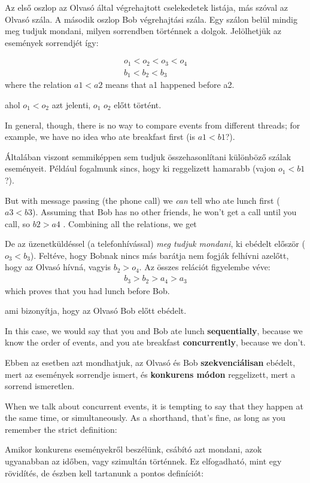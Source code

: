 \documentclass{book}
\begin{document}
Az első oszlop az Olvasó által végrehajtott cselekedetek listája,
más szóval az Olvasó szála. A második oszlop Bob végrehajtási szála.
Egy szálon belül mindig meg tudjuk mondani, milyen sorrendben történnek
a dolgok. Jelölhetjük az események sorrendjét így:

%
\begin{eqnarray*}
o_1 < o_2 < o_3 < o_4  \\
b_1 < b_2 < b_3
\end{eqnarray*}
%
where the relation $a1 < a2$ means that a1 happened before a2.

ahol $o_1 < o_2$ azt jelenti, $o_1$ $o_2$ előtt történt.

In general, though, there is no way to compare events from different
threads; for example, we have no idea who ate breakfast first (is $a1
< b1$?).

Általában viszont semmiképpen sem tudjuk összehasonlítani különböző
szálak eseményeit. Például fogalmunk sincs, hogy ki reggelizett
hamarabb (vajon $o_1<b1$?).

But with message passing (the phone call) we {\em can} tell who ate
lunch first ($a3 < b3$).  Assuming that Bob has no other friends, he
won't get a call until you call, so $b2 > a4$ .  Combining all the
relations, we get

De az üzenetküldéssel (a telefonhívással) {\em meg tudjuk mondani},
ki ebédelt először ($o_3 < b_3$). Feltéve, hogy Bobnak nincs más
barátja nem fogják felhívni azelőtt, hogy az Olvasó hívná, vagyis
$b_2 > o_4$. Az összes relációt figyelembe véve:
%
\begin{eqnarray*}
b_3 > b_2 > a_4 > a_3
\end{eqnarray*}
%
which proves that you had lunch before Bob.

ami bizonyítja, hogy az Olvasó Bob előtt ebédelt.

In this case, we would say that you and Bob ate lunch
{\bf sequentially}, because we know the order of events, and you
ate breakfast {\bf concurrently}, because we don't.

Ebben az esetben azt mondhatjuk, az Olvasó és Bob {\bf szekvenciálisan}
ebédelt, mert az események sorrendje ismert, és {\bf konkurens módon}
reggelizett, mert a sorrend ismeretlen.

When we talk about concurrent events, it is tempting to say
that they happen at the same time, or simultaneously.  As a
shorthand, that's fine, as long as you remember the strict
definition:

Amikor konkurens eseményekről beszélünk, csábító azt mondani,
azok ugyanabban az időben, vagy szimultán történnek. Ez
elfogadható, mint egy rövidítés, de észben kell tartanunk
a pontos definíciót:
\end{document}
